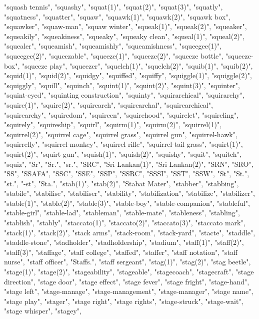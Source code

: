 "squash tennis",
"squashy",
"squat(1)",
"squat(2)",
"squat(3)",
"squatly",
"squatness",
"squatter",
"squaw",
"squawk(1)",
"squawk(2)",
"squawk box",
"squawker",
"squaw-man",
"squaw winter",
"squeak(1)",
"squeak(2)",
"squeaker",
"squeakily",
"squeakiness",
"squeaky",
"squeaky clean",
"squeal(1)",
"squeal(2)",
"squealer",
"squeamish",
"squeamishly",
"squeamishness",
"squeegee(1)",
"squeegee(2)",
"squeezable",
"squeeze(1)",
"squeeze(2)",
"squeeze bottle",
"squeeze-box",
"squeeze play",
"squeezer",
"squelch(1)",
"squelch(2)",
"squib(1)",
"squib(2)",
"squid(1)",
"squid(2)",
"squidgy",
"squiffed",
"squiffy",
"squiggle(1)",
"squiggle(2)",
"squiggly",
"squill",
"squinch",
"squint(1)",
"squint(2)",
"squint(3)",
"squinter",
"squint-eyed",
"squinting construction",
"squinty",
"squirarchical",
"squirarchy",
"squire(1)",
"squire(2)",
"squirearch",
"squirearchal",
"squirearchical",
"squirearchy",
"squiredom",
"squireen",
"squirehood",
"squirelet",
"squireling",
"squirely",
"squireship",
"squirl",
"squirm(1)",
"squirm(2)",
"squirrel(1)",
"squirrel(2)",
"squirrel cage",
"squirrel grass",
"squirrel gun",
"squirrel-hawk",
"squirrelly",
"squirrel-monkey",
"squirrel rifle",
"squirrel-tail grass",
"squirt(1)",
"squirt(2)",
"squirt-gun",
"squish(1)",
"squish(2)",
"squishy",
"squit",
"squitch",
"squiz",
"Sr",
"Sr.",
"sr.",
"SRC",
"Sri Lankan(1)",
"Sri Lankan(2)",
"SRN",
"SRO",
"SS",
"SSAFA",
"SSC",
"SSE",
"SSP",
"SSRC",
"SSSI",
"SST",
"SSW",
"St",
"St.",
"st.",
"-st",
"Sta.",
"stab(1)",
"stab(2)",
"Stabat Mater",
"stabber",
"stabbing",
"stabile",
"stabilise",
"stabiliser",
"stability",
"stabilization",
"stabilize",
"stabilizer",
"stable(1)",
"stable(2)",
"stable(3)",
"stable-boy",
"stable-companion",
"stableful",
"stable-girl",
"stable-lad",
"stableman",
"stable-mate",
"stableness",
"stabling",
"stablish",
"stably",
"staccato(1)",
"staccato(2)",
"staccato(3)",
"staccato mark",
"stack(1)",
"stack(2)",
"stack arms",
"stack-room",
"stack-yard",
"stacte",
"staddle",
"staddle-stone",
"stadholder",
"stadholdership",
"stadium",
"staff(1)",
"staff(2)",
"staff(3)",
"staffage",
"staff college",
"staffed",
"staffer",
"staff notation",
"staff nurse",
"staff officer",
"Staffs.",
"staff sergeant",
"stag(1)",
"stag(2)",
"stag beetle",
"stage(1)",
"stage(2)",
"stageability",
"stageable",
"stagecoach",
"stagecraft",
"stage direction",
"stage door",
"stage effect",
"stage fever",
"stage fright",
"stage-hand",
"stage left",
"stage-manage",
"stage-management",
"stage-manager",
"stage name",
"stage play",
"stager",
"stage right",
"stage rights",
"stage-struck",
"stage-wait",
"stage whisper",
"stagey",
